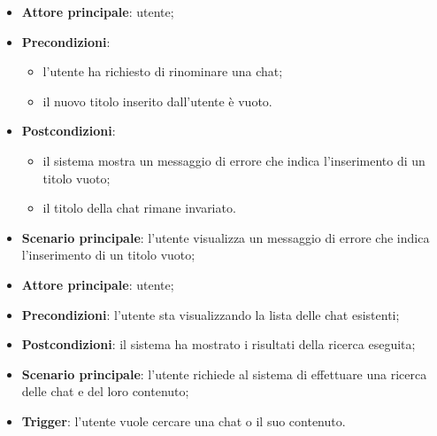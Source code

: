 \documentclass[10pt, a4paper]{article}
\begin{document}
    \begin{itemize}
        \item \textbf{Attore principale}: utente;
        \item \textbf{Precondizioni}:
        \begin{itemize}
            \item l’utente ha richiesto di rinominare una chat;
            \item il nuovo titolo inserito dall'utente è vuoto.
        \end{itemize}
        \item \textbf{Postcondizioni}: 
        \begin{itemize}
            \item il sistema mostra un messaggio di errore che indica l'inserimento di un titolo vuoto;
            \item il titolo della chat rimane invariato.
        \end{itemize}
        \item \textbf{Scenario principale}: l’utente visualizza un messaggio di errore che indica l’inserimento di un titolo vuoto;
    \end{itemize}

    \begin{itemize}
        \item \textbf{Attore principale}: utente;
        \item \textbf{Precondizioni}: l’utente sta visualizzando la lista delle chat esistenti;
        \item \textbf{Postcondizioni}: il sistema ha mostrato i risultati della ricerca eseguita;
        \item \textbf{Scenario principale}: l’utente richiede al sistema di effettuare una ricerca delle chat e del loro contenuto;
        \item \textbf{Trigger}: l’utente vuole cercare una chat o il suo contenuto.
    \end{itemize}
\end{document}
